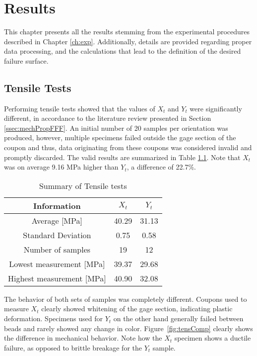 \documentclass[main.tex]{subfiles}
\begin{document}
\chapter{Results} \label{ch:res}

This chapter presents all the results stemming from the experimental procedures described in Chapter \ref{ch:exp}. Additionally, details are provided regarding proper data processing, and the calculations that lead to the definition of the desired failure surface. 

\section{Tensile Tests} \label{sec:tensr}
Performing tensile tests showed that the values of $X_t$ and $Y_t$ were significantly different, in accordance to the literature review presented in Section \ref{ssec:mechPropFFF}. An initial number of 20 samples per orientation was produced, however, multiple specimens failed outside the gage section of the coupon and thus, data originating from these coupons was considered invalid and promptly discarded. The valid results are summarized in Table \ref{tab:tensrtab}. Note that $X_t$ was on average 9.16 MPa higher than $Y_t$, a difference of 22.7\%.
\begin{table} [h]
	\centering
	\caption{Summary of Tensile tests}
\begin{tabular}{ c| c c } 
	\toprule
	\textbf{Information} & $X_t$ & $Y_t$\\
	\midrule
	Average [MPa] & 40.29 & 31.13\\
	Standard Deviation & 0.75 & 0.58\\
	Number of samples & 19 & 12\\
	Lowest measurement [MPa] &39.37  & 29.68\\
	Highest measurement [MPa] &40.90 & 32.08\\
	\bottomrule
\end{tabular}
\label{tab:tensrtab}
\end{table}

The behavior of both sets of samples was completely different. Coupons used to measure $X_t$ clearly showed whitening of the gage section, indicating plastic deformation. Specimens used for $Y_t$ on the other hand generally failed between beads and rarely showed any change in color. Figure~\ref{fig:tensComp} clearly shows the difference in mechanical behavior. Note how the $X_t$ specimen shows a ductile failure, as opposed to brittle breakage for the $Y_t$ sample.
\pagebreak
\end{document}
